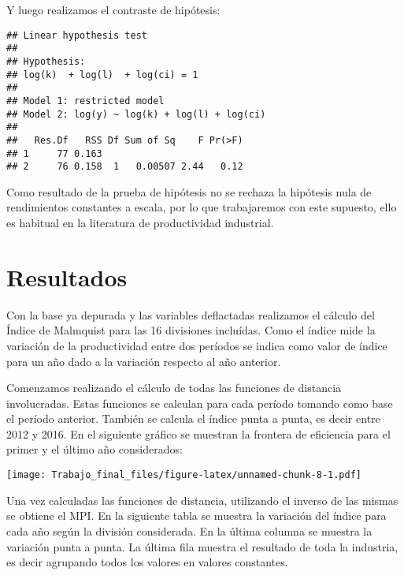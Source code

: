 \documentclass[
]{article}
\begin{document}
Y luego realizamos el contraste de hipótesis:

\begin{verbatim}
## Linear hypothesis test
## 
## Hypothesis:
## log(k)  + log(l)  + log(ci) = 1
## 
## Model 1: restricted model
## Model 2: log(y) ~ log(k) + log(l) + log(ci)
## 
##   Res.Df   RSS Df Sum of Sq    F Pr(>F)
## 1     77 0.163                         
## 2     76 0.158  1   0.00507 2.44   0.12
\end{verbatim}

Como resultado de la prueba de hipótesis no se rechaza la hipótesis nula
de rendimientos constantes a escala, por lo que trabajaremos con este
supuesto, ello es habitual en la literatura de productividad industrial.

\hypertarget{resultados}{%
\section{Resultados}\label{resultados}}

Con la base ya depurada y las variables deflactadas realizamos el
cálculo del Índice de Malmquist para las 16 divisiones incluídas. Como
el índice mide la variación de la productividad entre dos períodos se
indica como valor de índice para un año dado a la variación respecto al
año anterior.

Comenzamos realizando el cálculo de todas las funciones de distancia
involucradas. Estas funciones se calculan para cada período tomando como
base el período anterior. También se calcula el índice punta a punta, es
decir entre 2012 y 2016. En el siguiente gráfico se muestran la frontera
de eficiencia para el primer y el último año considerados:

\texttt{[image: Trabajo\_final\_files/figure-latex/unnamed-chunk-8-1.pdf]}

Una vez calculadas las funciones de distancia, utilizando el inverso de
las mismas se obtiene el MPI. En la siguiente tabla se muestra la
variación del índice para cada año según la división considerada. En la
última columna se muestra la variación punta a punta. La última fila
muestra el resultado de toda la industria, es decir agrupando todos los
valores en valores constantes.
\end{document}
